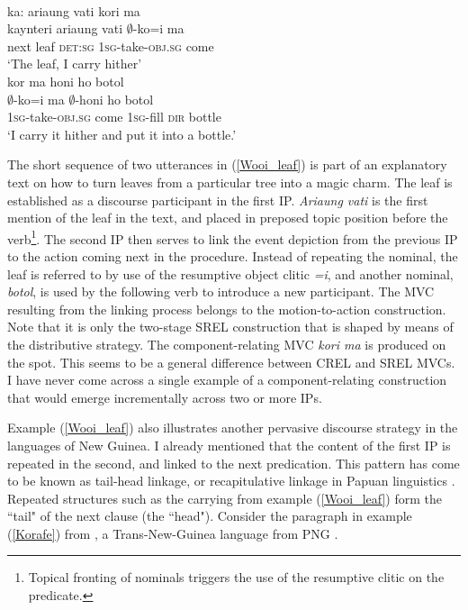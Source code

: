 \ea \label{Wooi_leaf}
\\
\ea
\glll ka: ariaung vati kori ma \\
kaynteri ariaung vati $\emptyset$-ko=i ma \\
next leaf \textsc{det}:\textsc{sg} \textsc{1}\textsc{sg}-take-\textsc{obj}.\textsc{sg} come \\
\glft `The leaf, I carry hither' \\ 
\ex
\glll kor ma honi ho botol \\
$\emptyset$-ko=i ma $\emptyset$-honi ho botol \\
\textsc{1}\textsc{sg}-take-\textsc{obj}.\textsc{sg} come \textsc{1}\textsc{sg}-fill \textsc{dir} bottle \\
\glft `I carry it hither and put it into a bottle.'\\
\z
\z

The short sequence of two utterances in (\ref{Wooi_leaf}) is part of an explanatory text on how to turn leaves from a particular tree into a magic charm. The leaf is established as a discourse participant in the first IP. \textit{Ariaung vati} is the first mention of the leaf in the text, and placed in preposed topic position before the verb\footnote{Topical fronting of nominals triggers the use of the resumptive clitic on the predicate.}. The second IP then serves to link the event depiction from the previous IP to the action coming next in the procedure. Instead of repeating the nominal, the leaf is referred to by use of the resumptive object clitic \textit{=i}, and another nominal, \textit{botol}, is used by the following verb to introduce a new participant. The MVC resulting from the linking process belongs to the motion-to-action construction. Note that it is only the two-stage SREL construction that is shaped by means of the distributive strategy. The component-relating MVC \textit{kori ma} is produced on the spot. This seems to be a general difference between CREL and SREL MVCs. I have never come across a single example of a component-relating construction that would emerge incrementally across two or more IPs.

Example (\ref{Wooi_leaf}) also illustrates another pervasive discourse strategy in the languages of New Guinea. I already mentioned that the content of the first IP is repeated in the second, and linked to the next predication. This pattern has come to be known as tail-head linkage, or recapitulative linkage in Papuan linguistics \citep{devries2005towards, devries2006areal}. Repeated structures such as the carrying from example (\ref{Wooi_leaf}) form the ``tail" of the next clause (the ``head"). Consider the paragraph in example (\ref{Korafe}) from , a Trans-New-Guinea language from PNG \citep{farr1999interface}.

